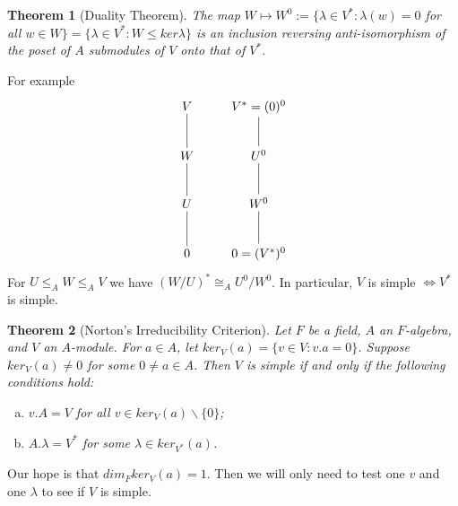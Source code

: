 \documentclass[12pt]{amsart}
\newtheorem{theorem}{Theorem}[section]
\theoremstyle{definition}
\begin{document}
\begin{theorem}[Duality Theorem]
The map $W\mapsto W^0:=\{\lambda\in V^*:\lambda(w)=0$ for all $w\in W\}=\{\lambda\in V^*:W\leq ker\lambda\}$ is an inclusion reversing anti-isomorphism of the poset of $A$ submodules of $V$ onto that of $V^*$.
\end{theorem}

For example
$$\xymatrix{V \ar@{-}[d] & V^*=(0)^0 \ar@{-}[d] \\
W \ar@{-}[d] & U^0 \ar@{-}[d] \\
U \ar@{-}[d] & W^0 \ar@{-}[d] \\
0 & 0=(V^*)^0}$$
For $U\leq_A W\leq_A V$ we have $(W/U)^*\cong_A U^0/W^0$.  In particular, $V$ is simple $\Leftrightarrow V^*$ is simple.

\begin{theorem}[Norton's Irreducibility Criterion]
Let $F$ be a field, $A$ an $F$-algebra, and $V$ an $A$-module.  For $a\in A$, let $ker_V(a)=\{v\in V:v.a=0\}$.  Suppose $ker_V(a)\neq 0$ for some $0\neq a\in A$. Then $V$ is simple if and only if the following conditions hold:
\begin{enumerate}[a)]
\item $v.A=V$ for all $v\in ker_V(a)\backslash\{0\}$;
\item $A.\lambda=V^*$ for some $\lambda\in ker_{V^*}(a)$.
\end{enumerate}
\end{theorem}

Our hope is that $dim_F ker_V(a)=1$.  Then we will only need to test one $v$ and one $\lambda$ to see if $V$ is simple.
\end{document}
